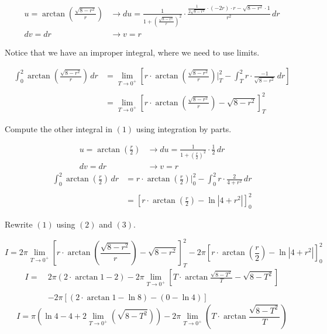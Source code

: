 \documentclass{article}
\begin{document}
\begin{align*}
\displaystyle u=\arctan\left(\frac{\sqrt{8-r^2}}r\right)&\rightarrow\displaystyle du=\frac1{\displaystyle1+\left(\frac{\sqrt{8-r^2}}r\right)^2}\cdot\frac{\displaystyle \frac{1}{2\sqrt{8-r^2}}\cdot(-2r)\cdot r -\sqrt{8-r^2}\cdot 1}{r^2}\,dr\\
\displaystyle dv=dr&\rightarrow v=r
\end{align*}

\newpage

Notice that we have an improper integral, where we need to use limits.

\begin{align}
\int_0^2\arctan\left(\frac{\sqrt{8-r^2}}r\right)\,dr&=\lim_{T\to0^+}\left[r\cdot\arctan\left(\frac{\sqrt{8-r^2}}r\right)\Bigg|_T^2-\int_T^2r\cdot\frac{-1}{\sqrt{8-r^2}}\,dr\right]\nonumber\\\nonumber\\&=\lim_{T\to0^+}\left[r\cdot\arctan\left(\frac{\sqrt{8-r^2}}r\right)-\sqrt{8-r^2}\right]_T^2
\end{align}

Compute the other integral in $(1)$ using integration by parts.

\begin{align*}
\displaystyle u=\arctan\left(\frac{r}2\right)&\rightarrow\displaystyle du=\frac1{\displaystyle1+\left(\frac{r}2\right)^2}\cdot\frac12\,dr\\
\displaystyle dv=dr&\rightarrow v=r
\end{align*}
\begin{align}
\int_0^2\arctan\left(\frac r2\right)\,dr&=r\cdot\arctan\left(\frac r2\right)\Bigg|_0^2-\int_0^2r\cdot\frac2{4+r^2}\,dr\nonumber\\\nonumber\\&=\left[r\cdot\arctan\left(\frac r 2\right)-\ln\left|4+r^2\right|\right]_0^2
\end{align}

Rewrite $(1)$ using $(2)$ and $(3)$.

\begin{equation*}
{I}=2\pi\lim_{T\to0^+}\left[r\cdot\arctan\left(\frac{\sqrt{8-r^2}}r\right)-\sqrt{8-r^2}\right]_T^2-2\pi\left[r\cdot\arctan\left(\frac r2\right)-\ln\left|4+r^2\right|\right]_0^2
\end{equation*}
\begin{align*}
{I}=\:&2\pi\left(2\cdot\arctan1-2\right)-2\pi\lim_{T\to0^+}\left[T\cdot\arctan\frac{\sqrt{8-T^2}}T-\sqrt{8-T^2}\right]\\\\&-2\pi\left[\left(2\cdot\arctan1-\ln8\right)-(0-\ln4)\right]
\end{align*}
\begin{equation}
{I}=\pi\left(\ln4-4+2\lim_{T\to0^+}\left(\sqrt{8-T^2}\right)\right)-2\pi\lim_{T\to0^+}\left(T\cdot\arctan\frac{\sqrt{8-T^2}}T\right)
\end{equation}
\end{document}
